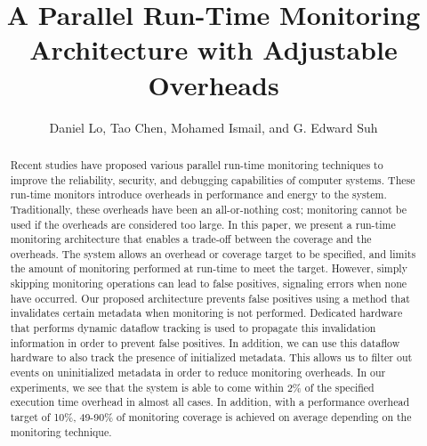 \title{
A Parallel Run-Time Monitoring Architecture with Adjustable Overheads
}

{\author{Daniel Lo, Tao Chen, Mohamed Ismail, and G. Edward Suh}}

\date{}
\maketitle

\thispagestyle{empty}

\begin{abstract}

Recent studies have proposed various parallel run-time monitoring techniques to
improve the reliability, security, and debugging capabilities of
computer systems. These run-time monitors introduce overheads in performance
and energy to the system. Traditionally, these overheads have been an
all-or-nothing cost; monitoring cannot be used if the overheads are considered too large.
In this paper, we present a run-time monitoring architecture that
enables a trade-off between the coverage and the overheads.
The system allows an overhead or coverage target to be specified,
and limits the amount of monitoring performed at run-time to meet the target. 
However, simply skipping monitoring operations can lead to false
positives, signaling errors when none have occurred. Our proposed architecture
prevents false positives using a method that invalidates certain metadata
when monitoring is not performed. Dedicated hardware that performs dynamic
dataflow tracking is used to propagate this invalidation
information in order to prevent false positives. In addition, we can use this
dataflow hardware to also track the presence of initialized metadata. This
allows us to filter out events on uninitialized metadata in order to reduce
monitoring overheads.
In our experiments, we see that the system is able to come within 2\% of the
specified execution time overhead in almost all cases.  In addition, with a
performance overhead target of 10\%, 49-90\% of monitoring coverage is achieved
on average depending on the monitoring technique.

\end{abstract}

